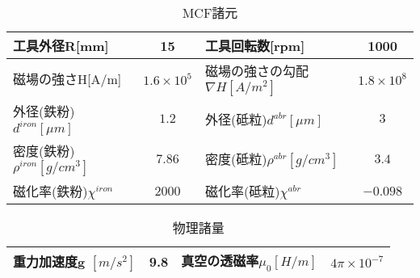 \documentclass[12pt]{jarticle}
\begin{document}
  \begin{table}[htb]
    \begin{tabular}{|l|c||l|c|} \hline 
         工具外径R[mm] & 15 & 工具回転数[rpm] & 1000 \\ \hline
         磁場の強さH[A/m] & $1.6\times10^5$ & 磁場の強さの勾配$\nabla H[A/m^2]$ & $1.8\times10^8$ \\ \hline
         外径(鉄粉)$d^{iron}[\mu m]$ & $1.2$ & 外径(砥粒)$d^{abr}[\mu m]$ & $3$ \\ \hline
         密度(鉄粉)$\rho^{iron}[g/cm^3]$ & $7.86$ & 密度(砥粒)$\rho^{abr}[g/cm^3]$ & $3.4$  \\ \hline
         磁化率(鉄粉)$\chi^{iron}$ & $2000$ & 磁化率(砥粒)$\chi^{abr}$ & $-0.098$  \\ \hline
    \end{tabular}
    \centering
    \label{tab:tab2}
    \caption{MCF諸元}
  \end{table}

  \begin{table}[htb]
    \begin{tabular}{|c|c||c|c|} \hline
      重力加速度g $[m/s^2]$ & 9.8 & 真空の透磁率$\mu_0[H/m]$ & $4\pi\times10^{-7}$ \\ \hline
    \end{tabular}
    \centering
    \label{tab:tab3}
    \caption{物理諸量}
  \end{table}
\end{document}
